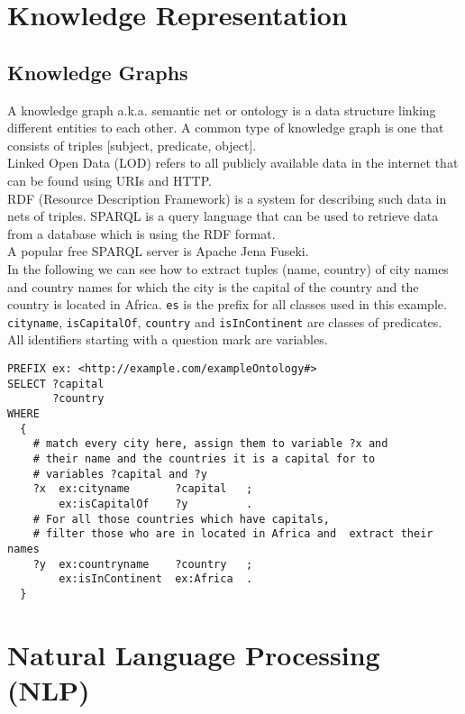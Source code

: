 \section{Knowledge Representation}

\subsection{Knowledge Graphs}

A knowledge graph a.k.a. semantic net or ontology is a data structure linking different entities to each other. A common type of knowledge graph is one that consists of triples [subject, predicate, object].\\
Linked Open Data (LOD) refers to all publicly available data in the internet that can be found using URIs and HTTP.\\
RDF (Resource Description Framework) is a system for describing such data in nets of triples. SPARQL is a query language that can be used to retrieve data from a database which is using the RDF format.\\
A popular free SPARQL server is Apache Jena Fuseki.\\

In the following we can see how to extract tuples (name, country) of city names and country names for which the city is the capital of the country and the country is located in Africa. \lstinline{es} is the prefix for all classes used in this example. \lstinline{cityname}, \lstinline{isCapitalOf}, \lstinline{country} and \lstinline{isInContinent} are classes of predicates. All identifiers starting with a question mark are variables.\\


\begin{lstlisting}[language=SPARQL]
PREFIX ex: <http://example.com/exampleOntology#>
SELECT ?capital
       ?country
WHERE
  {
    # match every city here, assign them to variable ?x and
    # their name and the countries it is a capital for to
    # variables ?capital and ?y
    ?x  ex:cityname       ?capital   ;
        ex:isCapitalOf    ?y         .
    # For all those countries which have capitals,
    # filter those who are in located in Africa and  extract their names
    ?y  ex:countryname    ?country   ;
        ex:isInContinent  ex:Africa  .
  }
\end{lstlisting}


\section{Natural Language Processing (NLP)}

